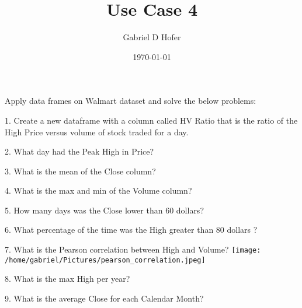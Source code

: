 \documentclass{article}
\title{Use Case 4}
\author{Gabriel D Hofer}
\date\today
\begin{document}
\maketitle



%

Apply data frames on Walmart dataset and solve the below problems:


1. Create a new dataframe with a column called HV Ratio that is the ratio of the High Price versus volume of stock traded for a day.



2. What day had the Peak High in Price?


3. What is the mean of the Close column?


4. What is the max and min of the Volume column?

\newpage

5. How many days was the Close lower than 60 dollars?


6. What percentage of the time was the High greater than 80 dollars ?


7. What is the Pearson correlation between High and Volume?
% 
\centering
\texttt{[image: /home/gabriel/Pictures/pearson\_correlation.jpeg]}


8. What is the max High per year?


9. What is the average Close for each Calendar Month?

\end{document}
